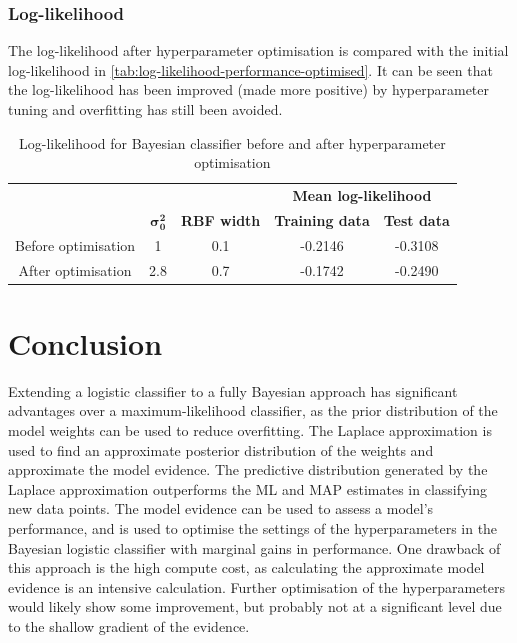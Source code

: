 \documentclass[a4paper]{article}
\begin{document}
    \subsubsection{Log-likelihood}
    The log-likelihood after hyperparameter optimisation is compared with the initial log-likelihood in \autoref{tab:log-likelihood-performance-optimised}.
    It can be seen that the log-likelihood has been improved (made more positive) by hyperparameter tuning and overfitting has still been avoided.
    \begin{table}[h!]
        \centering
        \begin{tabular}{c c c c c}
            & & & \multicolumn{2}{c}{\textbf{Mean log-likelihood}} \\
            &  $\bm{\sigma_0^2}$ & \textbf{RBF width} & \textbf{Training data} & \textbf{Test data} \\
            \hline
            Before optimisation & 1 & 0.1 & -0.2146 & -0.3108 \\
            After optimisation & 2.8 & 0.7 & -0.1742 & -0.2490
        \end{tabular}
        \caption{Log-likelihood for Bayesian classifier before and after hyperparameter optimisation}
        \label{tab:log-likelihood-performance-optimised}
    \end{table}

    \section{Conclusion}
    Extending a logistic classifier to a fully Bayesian approach has significant advantages over a maximum-likelihood classifier, as the prior distribution of the model weights can be used to reduce overfitting.
    The Laplace approximation is used to find an approximate posterior distribution of the weights and approximate the model evidence.
    The predictive distribution generated by the Laplace approximation outperforms the ML and MAP estimates in classifying new data points.
    The model evidence can be used to assess a model's performance, and is used to optimise the settings of the hyperparameters in the Bayesian logistic classifier with marginal gains in performance.
    One drawback of this approach is the high compute cost, as calculating the approximate model evidence is an intensive calculation.
    Further optimisation of the hyperparameters would likely show some improvement, but probably not at a significant level due to the shallow gradient of the evidence.
\end{document}

